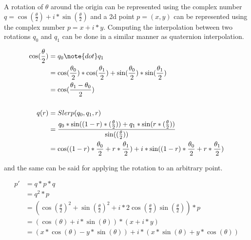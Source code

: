 		A rotation of $\theta$ around the origin can be represented using the complex number \( q = \cos(\frac{\theta}{2}) + i*\sin(\frac{\theta}{2}) \) and a 2d point \( p = (x, y) \) can be represented using the complex number \( p = x + i*y \). Computing the interpolation between two rotations \( q_0 \) and \( q_1 \) can be done in a similar manner as quaternion interpolation.
		
		\begin{equation}
		\begin{split}
		\cos(\frac{\theta}{2})	&= q_0 \note{dot} q_1 \\
								&= \cos(\frac{\theta_0}{2})*\cos(\frac{\theta_1}{2}) + \sin(\frac{\theta_0}{2})*\sin(\frac{\theta_1}{2}) \\
								&= \cos(\frac{\theta_1 - \theta_0}{2}) \\
								& \\
		q(r)				&= Slerp(q_0, q_1, r) \\
						&= \frac{q_0 * \sin((1-r)*(\frac{\theta}{2})) + q_1 * \sin(r*(\frac{\theta}{2}))}{\sin((\frac{\theta}{2}))} \\
						&= \cos((1-r)*\frac{\theta_0}{2} + r*\frac{\theta_1}{2}) + i*\sin((1-r)*\frac{\theta_0}{2} + r*\frac{\theta_1}{2}) \\
		\end{split}
		\end{equation}
		
		and the same can be said for applying the rotation to an arbitrary point.
		
		\begin{equation}
		\begin{split}
			p' 	&= q*p*q \\
				&= q^2*p \\
				&= (\cos(\frac{\theta}{2})^2 + \sin(\frac{\theta}{2})^2 + i*2\cos(\frac{\theta}{2})\sin(\frac{\theta}{2}))*p \\
				&= (\cos(\theta) + i*\sin(\theta))*(x + i*y) \\
				&= (x*\cos(\theta) - y*\sin(\theta)) + i*(x*\sin(\theta) + y*\cos(\theta)) \\
		\end{split}
		\end{equation}
			










